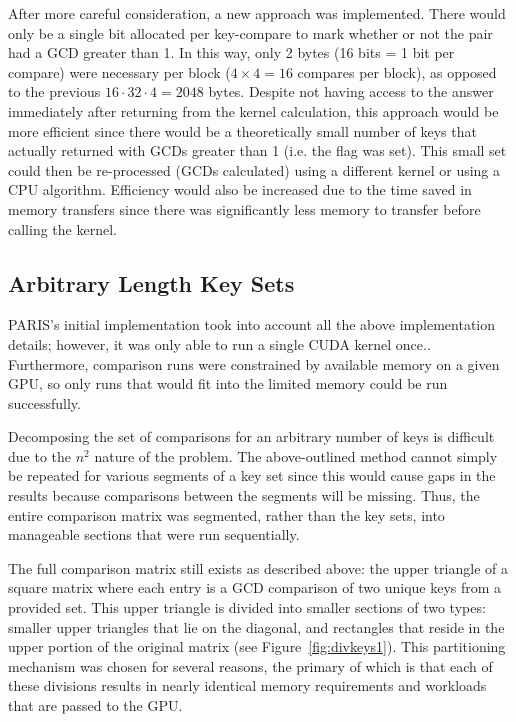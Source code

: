 \documentclass[12pt]{ucthesis}
\begin{document}
After more careful consideration, a new approach was implemented. There would 
only be a single bit allocated per key-compare to mark whether or not the pair 
had a GCD greater than 1. In this way, only 2 bytes (16 bits = 1 bit per 
compare) were necessary per block ($4\times4 = 16$ compares per block), as 
opposed to the previous $16 \cdot 32 \cdot 4 = 2048$ bytes. Despite not having access 
to the answer immediately after returning from the kernel calculation, this 
approach would be more efficient since there would be a theoretically small 
number of keys that actually returned with GCDs greater than 1 (i.e. the flag 
was set). This small set could then be re-processed (GCDs calculated) using a 
different kernel or using a CPU algorithm. Efficiency would also be increased 
due to the time saved in memory transfers since there was significantly less 
memory to transfer before calling the kernel.

\subsection{Arbitrary Length Key Sets}
\label{subsec:arblength}
PARIS's initial implementation \citep{scharfglass2012breaking} took into
account all the above implementation details; however, it was only able to run
a single CUDA kernel once.. Furthermore, comparison runs were constrained by
available memory on a given GPU, so only runs that would fit into the limited
memory could be run successfully.

Decomposing the set of comparisons for an arbitrary number of keys is difficult
due to the $n^2$ nature of the problem. The above-outlined method cannot simply
be repeated for various segments of a key set since this would cause gaps in
the results because comparisons between the segments will be missing. Thus, the
entire comparison matrix was segmented, rather than the key sets, into
manageable sections that were run sequentially.

The full comparison matrix still exists as described above: the upper triangle
of a square matrix where each entry is a GCD comparison of two unique keys from
a provided set. This upper triangle is divided into smaller sections of two
types: smaller upper triangles that lie on the diagonal, and rectangles that
reside in the upper portion of the original matrix (see
Figure~\ref{fig:divkeys1}). This partitioning mechanism was chosen for several
reasons, the primary of which is that each of these divisions results in nearly
identical memory requirements and workloads that are passed to the GPU. 
\end{document}
